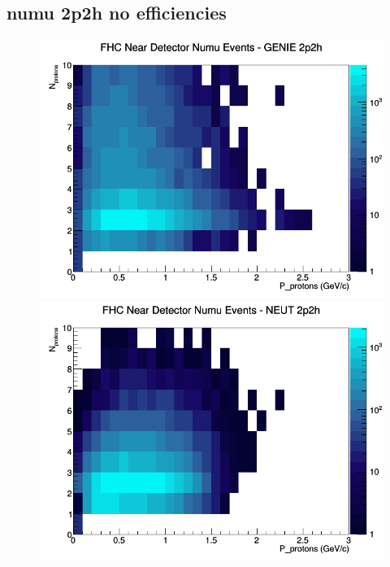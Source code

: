 \subsection{numu 2p2h no efficiencies}
\begin{figure}[h]
\includegraphics[width=\linewidth]{N_P/nominal/protons/2p2h_FHC_ND_numu_N_P_GENIE.png}
\endminipage
{}
\includegraphics[width=\linewidth]{N_P/nominal/protons/2p2h_FHC_ND_numu_N_P_NEUT.png}
\endminipage
{}

\end{figure}
